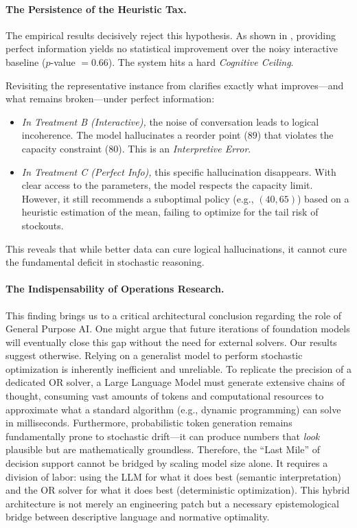 \documentclass[mnsc,nonblindrev]{informs3_hide}
\begin{document}
\paragraph{The Persistence of the Heuristic Tax.}The empirical results decisively reject this hypothesis. As shown in , providing perfect information yields no statistical improvement over the noisy interactive baseline ($p$-value $= 0.66$). The system hits a hard \emph{Cognitive Ceiling}.

Revisiting the representative instance from  clarifies exactly what improves—and what remains broken—under perfect information:
\begin{itemize}
\item \emph{In Treatment B (Interactive),} the noise of conversation leads to logical incoherence. The model hallucinates a reorder point ($89$) that violates the capacity constraint ($80$). This is an \emph{Interpretive Error}.
\item \emph{In Treatment C (Perfect Info),} this specific hallucination disappears. With clear access to the parameters, the model respects the capacity limit. However, it still recommends a suboptimal policy (e.g., $(40, 65)$) based on a heuristic estimation of the mean, failing to optimize for the tail risk of stockouts.
\end{itemize}
This reveals that while better data can cure logical hallucinations, it cannot cure the fundamental deficit in stochastic reasoning.
\vspace{.5em}

\paragraph{The Indispensability of Operations Research.}This finding brings us to a critical architectural conclusion regarding the role of General Purpose AI. One might argue that future iterations of foundation models will eventually close this gap without the need for external solvers. Our results suggest otherwise.
Relying on a generalist model to perform stochastic optimization is inherently inefficient and unreliable. To replicate the precision of a dedicated OR solver, a Large Language Model must generate extensive chains of thought, consuming vast amounts of tokens and computational resources to approximate what a standard algorithm (e.g., dynamic programming) can solve in milliseconds. Furthermore, probabilistic token generation remains fundamentally prone to stochastic drift—it can produce numbers that \emph{look} plausible but are mathematically groundless.
Therefore, the ``Last Mile'' of decision support cannot be bridged by scaling model size alone. It requires a division of labor: using the LLM for what it does best (semantic interpretation) and the OR solver for what it does best (deterministic optimization). This hybrid architecture is not merely an engineering patch but a necessary epistemological bridge between descriptive language and normative optimality.
\end{document}
